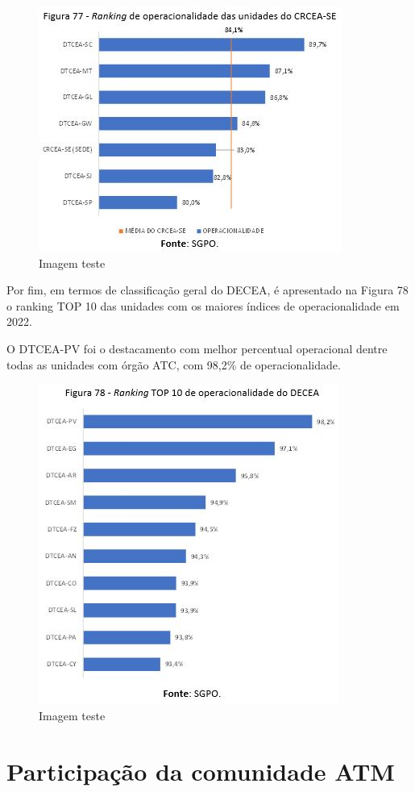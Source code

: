 \documentclass[
]{book}
\begin{document}
\begin{figure}
\centering
\includegraphics{imagens/fig63.jpg}
\caption{Imagem teste}
\end{figure}

Por fim, em termos de classificação geral do DECEA, é apresentado na Figura 78 o ranking TOP 10 das unidades com os maiores índices de operacionalidade em 2022.

O DTCEA-PV foi o destacamento com melhor percentual operacional dentre todas as unidades com órgão ATC, com 98,2\% de operacionalidade.

\begin{figure}
\centering
\includegraphics{imagens/fig64.jpg}
\caption{Imagem teste}
\end{figure}

\hypertarget{participauxe7uxe3o-da-comunidade-atm}{%
\section{Participação da comunidade ATM}\label{participauxe7uxe3o-da-comunidade-atm}}
\end{document}
